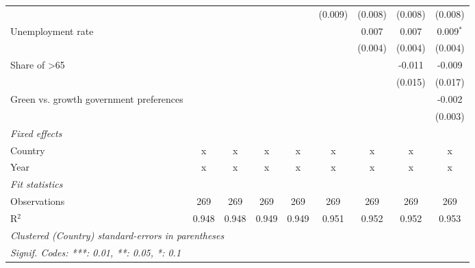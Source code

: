 \begin{table}[htbp]
\begin{tabular}{lcccccccc}
                                                         &              &              &              &              & (0.009)      & (0.008)      & (0.008)      & (0.008)\\   
      Unemployment rate                                  &              &              &              &              &              & 0.007        & 0.007        & 0.009$^{*}$\\   
                                                         &              &              &              &              &              & (0.004)      & (0.004)      & (0.004)\\   
      Share of >65                                       &              &              &              &              &              &              & -0.011       & -0.009\\   
                                                         &              &              &              &              &              &              & (0.015)      & (0.017)\\   
      Green vs. growth government preferences            &              &              &              &              &              &              &              & -0.002\\   
                                                         &              &              &              &              &              &              &              & (0.003)\\   
      \emph{Fixed effects}\\
      Country                                            & x            & x            & x            & x            & x            & x            & x            & x\\  
      Year                                               & x            & x            & x            & x            & x            & x            & x            & x\\  
      \midrule \emph{Fit statistics}\\
      Observations                                       & 269          & 269          & 269          & 269          & 269          & 269          & 269          & 269\\  
      R$^2$                                              & 0.948        & 0.948        & 0.949        & 0.949        & 0.951        & 0.952        & 0.952        & 0.953\\  
      \midrule
      \multicolumn{9}{l}{\emph{Clustered (Country) standard-errors in parentheses}}\\
      \multicolumn{9}{l}{\emph{Signif. Codes: ***: 0.01, **: 0.05, *: 0.1}}\\
   \end{tabular}
\end{table}


